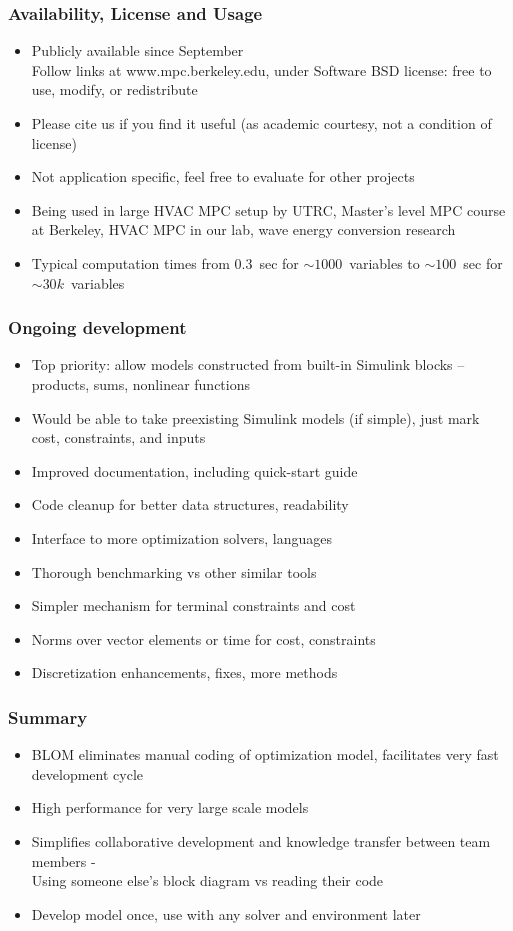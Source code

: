 \documentclass[mathserif]{beamer}
\begin{document}
\begin{frame}
\frametitle{Availability, License and Usage}
\begin{itemize}
\item 	Publicly available since September
 \\
	Follow links at {\color{blue} www.mpc.berkeley.edu}, under Software BSD license: free to use, modify, or redistribute
\item 		Please cite us if you find it useful
	(as academic courtesy, not a condition of license)
\item 		Not application specific, feel free to evaluate for other projects
\item 		Being used in large HVAC MPC setup by UTRC, Master's level MPC course at Berkeley, HVAC MPC in our lab, wave energy conversion research
\item    Typical computation times from $0.3$~sec for $\sim 1000$~variables to $\sim 100$~sec for $\sim 30k$~variables 
\end{itemize}

\end{frame}

\begin{frame}
\frametitle{Ongoing development}
\begin{itemize}
\item	Top priority: allow models constructed from built-in Simulink blocks -- products, sums, nonlinear functions
\item	Would be able to take preexisting Simulink models (if simple), just mark cost, constraints, and inputs
\item	Improved documentation, including quick-start guide
\item	Code cleanup for better data structures, readability
\item	Interface to more optimization solvers, languages
\item	Thorough benchmarking vs other similar tools
\item	Simpler mechanism for terminal constraints and cost
\item	Norms over vector elements or time for cost, constraints
\item	Discretization enhancements, fixes, more methods
\end{itemize}
\end{frame}


\begin{frame}
\frametitle{Summary}
\begin{itemize}
\item	BLOM eliminates manual coding of optimization model, facilitates very fast development cycle
\item	High performance for very large scale models
\item	Simplifies collaborative development and knowledge transfer between team members -
\\
	Using someone else's block diagram vs reading their code
\item	Develop model once, use with any solver and environment later
\end{itemize}

\end{frame}
\end{document}
